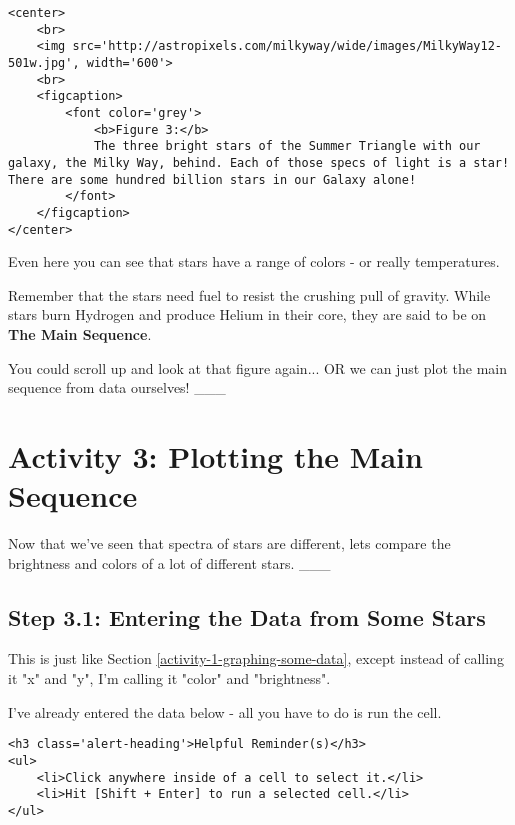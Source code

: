 \documentclass[11pt]{article}
\begin{document}
\begin{verbatim}
<center>
    <br>
    <img src='http://astropixels.com/milkyway/wide/images/MilkyWay12-501w.jpg', width='600'>
    <br>
    <figcaption>
        <font color='grey'>
            <b>Figure 3:</b>
            The three bright stars of the Summer Triangle with our galaxy, the Milky Way, behind. Each of those specs of light is a star! There are some hundred billion stars in our Galaxy alone!
        </font>
    </figcaption>
</center>
\end{verbatim}

Even here you can see that stars have a range of colors - or really
temperatures.

Remember that the stars need fuel to resist the crushing pull of
gravity. While stars burn Hydrogen and produce Helium in their core,
they are said to be on \textbf{The Main Sequence}.

You could scroll up and look at that figure again... OR we can just plot
the main sequence from data ourselves! \_\_\_

    \section{Activity 3: Plotting the Main
Sequence}\label{activity-3-plotting-the-main-sequence}

Now that we've seen that spectra of stars are different, lets compare
the brightness and colors of a lot of different stars. \_\_\_

    \subsection{Step 3.1: Entering the Data from Some
Stars}\label{step-3.1-entering-the-data-from-some-stars}

This is just like Section \ref{activity-1-graphing-some-data}, except
instead of calling it "x" and "y", I'm calling it "color" and
"brightness".

I've already entered the data below - all you have to do is run the
cell.

\begin{verbatim}
<h3 class='alert-heading'>Helpful Reminder(s)</h3>
<ul>
    <li>Click anywhere inside of a cell to select it.</li>
    <li>Hit [Shift + Enter] to run a selected cell.</li>
</ul>
\end{verbatim}
\end{document}
